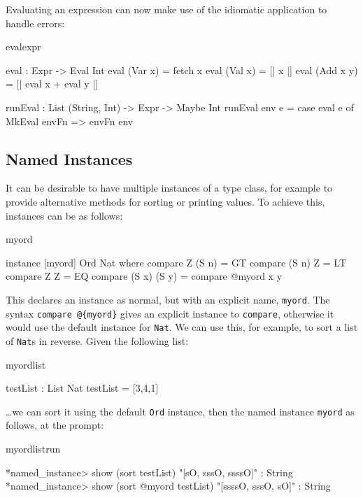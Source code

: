 
\noindent
Evaluating an expression can now make use of the idiomatic application to handle
errors:

\begin{SaveVerbatim}{evalexpr}

eval : Expr -> Eval Int
eval (Var x)   = fetch x
eval (Val x)   = [| x |]
eval (Add x y) = [| eval x + eval y |]
  
runEval : List (String, Int) -> Expr -> Maybe Int
runEval env e = case eval e of
    MkEval envFn => envFn env

\end{SaveVerbatim}

\subsection{Named Instances}

It can be desirable to have multiple instances of a type class, for example to provide
alternative methods for sorting or printing values. To achieve this, instances can
be  as follows:

\begin{SaveVerbatim}{myord}

instance [myord] Ord Nat where
   compare Z (S n)     = GT
   compare (S n) Z     = LT
   compare Z Z         = EQ
   compare (S x) (S y) = compare @{myord} x y

\end{SaveVerbatim}

\noindent
This declares an instance as normal, but with an explicit name, \texttt{myord}.
The syntax \texttt{compare @\{myord\}} gives an explicit instance to 
\texttt{compare}, otherwise it would use the default instance for \texttt{Nat}.
We can use this, for example, to sort a list of \texttt{Nat}s in reverse.
Given the following list:

\begin{SaveVerbatim}{myordlist}

testList : List Nat
testList = [3,4,1]

\end{SaveVerbatim}

\noindent
\ldots we can sort it using the default \texttt{Ord} instance, then the named
instance \texttt{myord} as follows, at the \Idris{} prompt:

\begin{SaveVerbatim}{myordlistrun}

*named_instance> show (sort testList)
"[sO, sssO, ssssO]" : String
*named_instance> show (sort @{myord} testList)
"[ssssO, sssO, sO]" : String

\end{SaveVerbatim}

